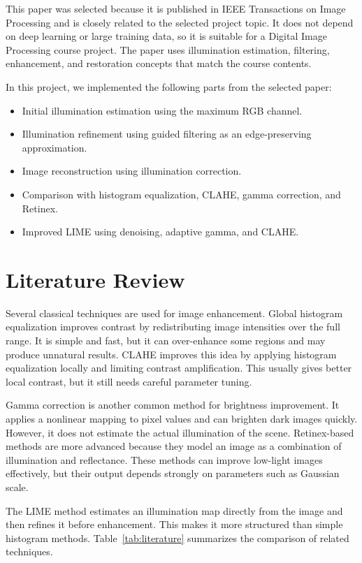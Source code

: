 \documentclass[11pt]{article}
\begin{document}
This paper was selected because it is published in IEEE Transactions on Image Processing and is closely related to the selected project topic. It does not depend on deep learning or large training data, so it is suitable for a Digital Image Processing course project. The paper uses illumination estimation, filtering, enhancement, and restoration concepts that match the course contents.

In this project, we implemented the following parts from the selected paper:
\begin{itemize}
    \item Initial illumination estimation using the maximum RGB channel.
    \item Illumination refinement using guided filtering as an edge-preserving approximation.
    \item Image reconstruction using illumination correction.
    \item Comparison with histogram equalization, CLAHE, gamma correction, and Retinex.
    \item Improved LIME using denoising, adaptive gamma, and CLAHE.
\end{itemize}

\section{Literature Review}
Several classical techniques are used for image enhancement. Global histogram equalization improves contrast by redistributing image intensities over the full range. It is simple and fast, but it can over-enhance some regions and may produce unnatural results. CLAHE improves this idea by applying histogram equalization locally and limiting contrast amplification. This usually gives better local contrast, but it still needs careful parameter tuning.

Gamma correction is another common method for brightness improvement. It applies a nonlinear mapping to pixel values and can brighten dark images quickly. However, it does not estimate the actual illumination of the scene. Retinex-based methods are more advanced because they model an image as a combination of illumination and reflectance. These methods can improve low-light images effectively, but their output depends strongly on parameters such as Gaussian scale.

The LIME method estimates an illumination map directly from the image and then refines it before enhancement. This makes it more structured than simple histogram methods. Table~\ref{tab:literature} summarizes the comparison of related techniques.
\end{document}
